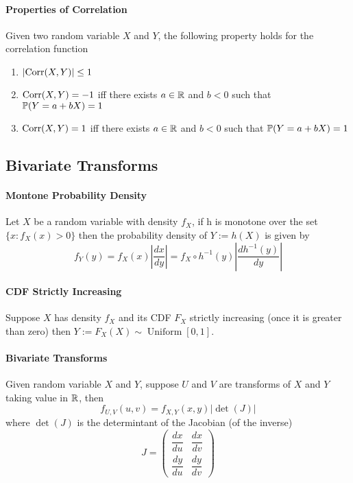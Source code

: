 \paragraph{Properties of Correlation}
Given two random variable \(X\) and \(Y\), the following property holds for the correlation function
\begin{enumerate}
    \item \(|\mathrm{Corr}(X,Y)| \leq 1\)
    \item \(\mathrm{Corr}(X,Y) = -1\) iff there exists \(a \in \mathbb{R}\) and \(b < 0\) such that \(\mathbb{P}(Y = a + bX) = 1\)
    \item \(\mathrm{Corr}(X,Y) = 1\) iff there exists \(a \in \mathbb{R}\) and \(b < 0\) such that \(\mathbb{P}(Y = a + bX) = 1\)
\end{enumerate}

\subsection{Bivariate Transforms}
\paragraph{Montone Probability Density}
Let \(X\) be a random variable with density \(f_X\), if h is monotone over the set \(\{ x: f_X(x) > 0 \}\) then the probability density of \(Y := h(X)\) is given by 
\[f_Y(y) = f_X(x) \left| \frac{dx}{dy} \right| = f_X \circ h^{-1}(y) \left|\frac{dh^{-1}(y)}{dy} \right|\]

\paragraph{CDF Strictly Increasing}
Suppose \(X\) has density \(f_X\) and its CDF \(F_X\) strictly increasing (once it is greater than zero) then \(Y := F_X(X) \sim \operatorname{Uniform}[0,1]\).

\paragraph{Bivariate Transforms}
Given random variable \(X\) and \(Y\), suppose \(U\) and \(V\) are transforms of \(X\) and \(Y\) taking value in \(\mathbb{R}\), then
\[f_{U,V}(u,v) = f_{X,Y}(x,y)|\det(J)|\]
where \(\det(J)\) is the determintant of the Jacobian (of the inverse)
\[J = \begin{pmatrix}
    \dfrac{dx}{du} & \dfrac{dx}{dv} \\
    \dfrac{dy}{du} & \dfrac{dy}{dv}
\end{pmatrix}
\]

